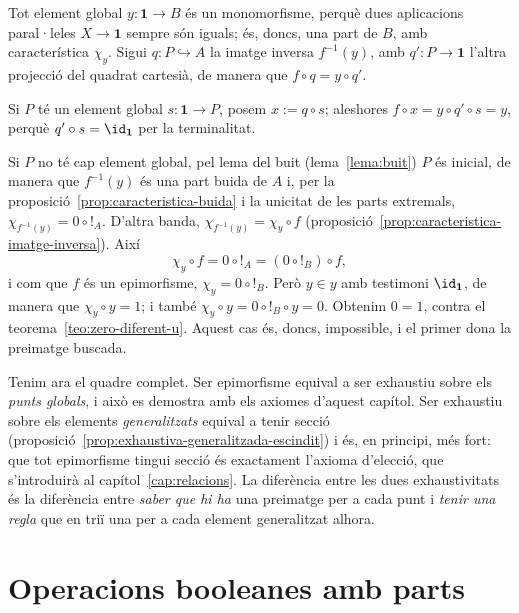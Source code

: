 \begin{prova}
Tot element global \(y\colon\mathbf1\to B\) és un monomorfisme, perquè dues aplicacions paral·leles \(X\to\mathbf1\) sempre són iguals; és, doncs, una part de \(B\), amb característica \(\chi_y\). Sigui \(q\colon P\hookrightarrow A\) la imatge inversa \(f^{-1}(y)\), amb \(q'\colon P\to\mathbf1\) l'altra projecció del quadrat cartesià, de manera que \(f\circ q=y\circ q'\).

Si \(P\) té un element global \(s\colon\mathbf1\to P\), posem \(x:=q\circ s\); aleshores \(f\circ x=y\circ q'\circ s=y\), perquè \(q'\circ s=\id_{\mathbf1}\) per la terminalitat.

Si \(P\) no té cap element global, pel lema del buit (lema~\ref{lema:buit}) \(P\) és inicial, de manera que \(f^{-1}(y)\) és una part buida de \(A\) i, per la proposició~\ref{prop:caracteristica-buida} i la unicitat de les parts extremals, \(\chi_{f^{-1}(y)}=0\circ{!}_A\). D'altra banda, \(\chi_{f^{-1}(y)}=\chi_y\circ f\) (proposició~\ref{prop:caracteristica-imatge-inversa}). Així
\[
\chi_y\circ f=0\circ{!}_A=(0\circ{!}_B)\circ f,
\]
i com que \(f\) és un epimorfisme, \(\chi_y=0\circ{!}_B\). Però \(y\in y\) amb testimoni \(\id_{\mathbf1}\), de manera que \(\chi_y\circ y=1\); i també \(\chi_y\circ y=0\circ{!}_B\circ y=0\). Obtenim \(0=1\), contra el teorema~\ref{teo:zero-diferent-u}. Aquest cas és, doncs, impossible, i el primer dona la preimatge buscada.
\end{prova}

\begin{observacio}\label{obs:dues-exhaustivitats}
Tenim ara el quadre complet. Ser epimorfisme equival a ser exhaustiu sobre els \emph{punts globals}, i això es demostra amb els axiomes d'aquest capítol. Ser exhaustiu sobre els elements \emph{generalitzats} equival a tenir secció (proposició~\ref{prop:exhaustiva-generalitzada-escindit}) i és, en principi, més fort: que tot epimorfisme tingui secció és exactament l'axioma d'elecció, que s'introduirà al capítol~\ref{cap:relacions}. La diferència entre les dues exhaustivitats és la diferència entre \emph{saber que hi ha} una preimatge per a cada punt i \emph{tenir una regla} que en triï una per a cada element generalitzat alhora.
\end{observacio}

\section{Operacions booleanes amb parts}\label{sec:booleanes}

